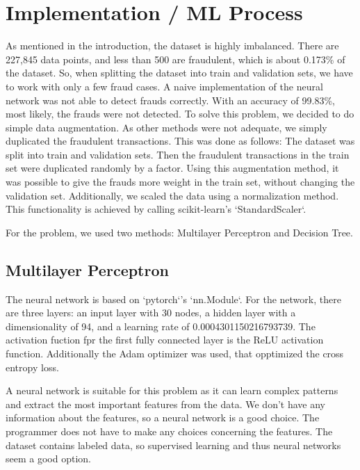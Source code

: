 \documentclass[a4paper, 10pt, conference]{ieeeconf}      %
\begin{document}
\section{Implementation / ML Process}
\label{sec:methods}
As mentioned in the introduction, the dataset is highly imbalanced. There are 227,845 data points, and less than 500 are fraudulent, which is about 0.173\% of the dataset. So, when splitting the dataset into train and validation sets, we have to work with only a few fraud cases. 
A naive implementation of the neural network was not able to detect frauds correctly. With an accuracy of 99.83\%, most likely, the frauds were not detected. 
To solve this problem, we decided to do simple data augmentation. As other methods were not adequate, we simply duplicated the fraudulent transactions. 
This was done as follows: The dataset was split into train and validation sets. Then the fraudulent transactions in the train set were duplicated randomly by a factor. 
Using this augmentation method, it was possible to give the frauds more weight in the train set, without changing the validation set. 
Additionally, we scaled the data using a normalization method. This functionality is achieved by calling scikit-learn's `StandardScaler`. 

For the problem, we used two methods: Multilayer Perceptron and Decision Tree. 

\subsection{Multilayer Perceptron}

The neural network is based on `pytorch`'s `nn.Module`. For the network, there are three layers: 
an input layer with 30 nodes, a hidden layer with a dimensionality of 94, and a learning rate of 0.0004301150216793739. 
The activation fuction fpr the first fully connected layer is the ReLU activation function. Additionally the Adam optimizer was used, that opptimized the cross entropy loss. 

A neural network is suitable for this problem as it can learn complex patterns and extract the most important features from the data. 
We don't have any information about the features, so a neural network is a good choice. The programmer does not have to make any choices concerning the features. 
The dataset contains labeled data, so supervised learning and thus neural networks seem a good option.
\end{document}
